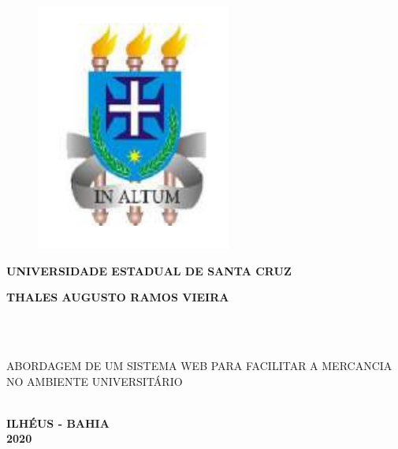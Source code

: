 \thispagestyle{empty}

\vfill
 \begin{center}
    
    \begin{figure}
	   \centering
	   		\includegraphics[scale=0.35]{figs/brasao_uesc.png} 
    \end{figure}
    
    {\large\bfseries UNIVERSIDADE ESTADUAL DE SANTA CRUZ} \\
    
   

    \vspace*{1in}
    \begin{large} \bfseries THALES AUGUSTO RAMOS VIEIRA \end{large}\\[0.4in]

    \vspace*{4cm}
    \noindent \\
    
    \large\bfseries{\begin{large}ABORDAGEM DE UM SISTEMA WEB PARA FACILITAR A MERCANCIA NO AMBIENTE UNIVERSITÁRIO \end{large}} \\
    \vfill
    \large\bfseries{ ILHÉUS - BAHIA \\ 2020}
\end{center}

\normalsize


